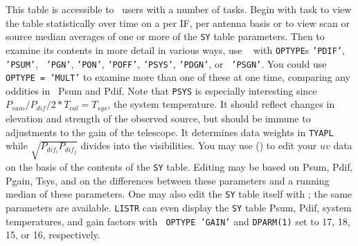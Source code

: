 This table is accessible to \AIPS\ users with a number of tasks.
Begin with task {\tt {}} to view the table statistically
over time on a per IF, per antenna basis or to view scan or source
median averages of one or more of the {\tt SY} table parameters.  Then
to examine its contents in more detail in various ways, use {\tt
{}} with {\tt OPTYPE}s {\tt 'PDIF'}, {\tt 'PSUM'}, {\tt
'PGN'}, {\tt 'PON'}, {\tt 'POFF'}, {\tt 'PSYS'}, {\tt 'PDGN'}, or {\tt
'PSGN'}\@.  You could use {\tt OPTYPE = 'MULT'} to examine more than
one of these at one time, comparing any oddities in \eg\ Psum and
Pdif.  Note that {\tt PSYS} is especially interesting since
$P_{sum}/P_{dif}/2*T_{cal} = T_{sys}$, the system temperature.  It
should reflect changes in elevation and strength of the observed
source, but should be immune to adjustments to the gain of the
telescope.  It determines data weights in {\tt TYAPL} while
$\sqrt{P_{dif_i} P_{dif_j}}$ divides into the visibilities.  You may
use {\tt {}} () to edit your $uv$ data on the
basis of the contents of the {\tt SY} table.  Editing may be based on
Psum, Pdif, Pgain, Tsys, and on the differences between these
parameters and a running median of these parameters.  One may also
edit the {\tt SY} table itself with {\tt {}}; the same
parameters are available.  {\tt LISTR} can even display the {\tt SY}
table Psum, Pdif,  system temperatures, and gain factors with {\tt
OPTYPE 'GAIN'} and {\tt DPARM(1)} set to 17, 18, 15, or 16,
respectively.

